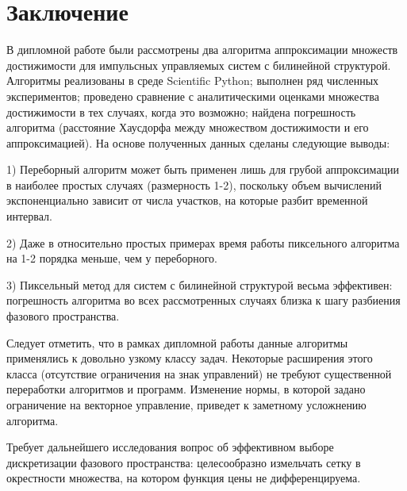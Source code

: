 \section*{Заключение}
\label{sec:conclusion}

В дипломной работе были рассмотрены два алгоритма аппроксимации множеств достижимости для импульсных управляемых систем с билинейной структурой. Алгоритмы реализованы в среде Scientific Python; выполнен ряд численных экспериментов; проведено сравнение с аналитическими оценками множества достижимости в тех случаях, когда это возможно; найдена погрешность алгоритма (расстояние Хаусдорфа между множеством достижимости и его аппроксимацией). На основе полученных данных сделаны следующие выводы:

1) Переборный алгоритм может быть применен лишь для грубой аппроксимации в наиболее простых случаях (размерность 1-2), поскольку объем вычислений экспоненциально зависит от числа участков, на которые разбит временной интервал.

2) Даже в относительно простых примерах время работы пиксельного алгоритма на 1-2 порядка меньше, чем у переборного.

3) Пиксельный метод для систем с билинейной структурой весьма эффективен: погрешность алгоритма во всех рассмотренных случаях близка к шагу разбиения фазового пространства.

Следует отметить, что в рамках дипломной работы данные алгоритмы применялись к довольно узкому классу задач. Некоторые расширения этого класса (отсутствие ограничения на знак управлений) не требуют существенной переработки алгоритмов и программ. Изменение нормы, в которой задано ограничение на векторное управление, приведет к заметному усложнению алгоритма.

Требует дальнейшего исследования вопрос об эффективном выборе дискретизации фазового пространства:  целесообразно измельчать сетку в окрестности множества, на котором функция цены не дифференцируема.%
